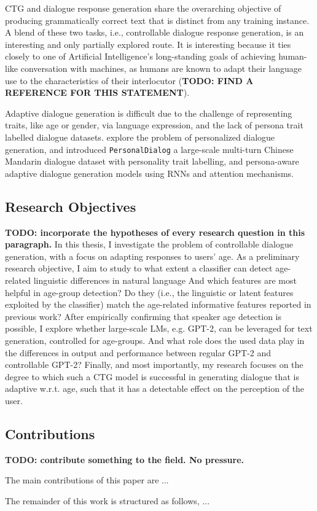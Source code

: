 CTG and dialogue response generation share the overarching objective of producing grammatically correct text that is distinct from any training instance. A blend of these two tasks, i.e., controllable dialogue response generation, is an interesting and only partially explored route. It is interesting because it ties closely to one of Artificial Intelligence's long-standing goals of achieving human-like conversation with machines, as humans are known to adapt their language use to the characteristics of their interlocutor (\textbf{TODO: FIND A REFERENCE FOR THIS STATEMENT}). 

Adaptive dialogue generation is difficult due to the challenge of representing traits, like age or gender, via language expression, and the lack of persona trait labelled dialogue datasets. \cite{zheng2019personalized} explore the problem of personalized dialogue generation, and introduced \texttt{PersonalDialog} a large-scale multi-turn Chinese Mandarin dialogue dataset with personality trait labelling, and persona-aware adaptive dialogue generation models using RNNs and attention mechanisms. 

\subsection{Research Objectives}
\textbf{TODO: incorporate the hypotheses of every research question in this paragraph.}
In this thesis, I investigate the problem of controllable dialogue generation, with a focus on adapting responses to users' age. As a preliminary research objective, I aim to study to what extent a classifier can detect age-related linguistic differences in natural language And which features are most helpful in age-group detection? Do they (i.e., the linguistic or latent features exploited by the classifier) match the age-related informative features reported in previous work? 
After empirically confirming that speaker age detection is possible, I explore whether large-scale LMs, e.g. GPT-2, can be leveraged for text generation, controlled for age-groups. And what role does the used data play in the differences in output and performance between regular GPT-2 and controllable GPT-2?
Finally, and most importantly, my research focuses on the degree to which such a CTG model is successful in generating dialogue that is adaptive w.r.t. age, such that it has a detectable effect on the perception of the user.

\subsection{Contributions}

\textbf{TODO: contribute something to the field. No pressure.}

The main contributions of this paper are ...

The remainder of this work is structured as follows, ...